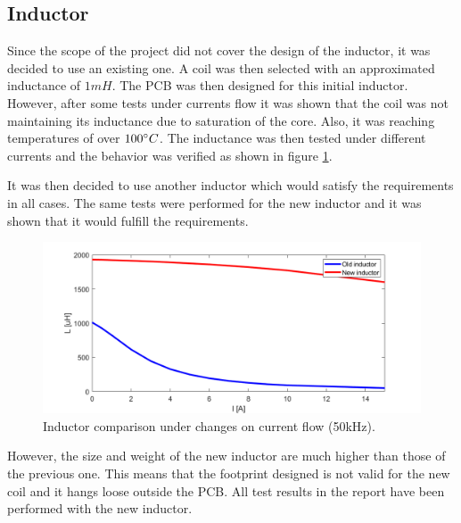 \subsection{Inductor}
\label{Coil problems}
Since the scope of the project did not cover the design of the inductor, it was decided to use an existing one. A coil was then selected with an approximated inductance of $1mH$.
The PCB was then designed for this initial inductor. However, after some  tests under currents flow it was shown that the coil was not maintaining its inductance due to saturation of the core. Also, it was reaching temperatures of over $100\dec C$. The inductance was then tested under different currents and the behavior was verified as shown in figure \ref{Coil comparison}.

It was then decided to use another inductor which would satisfy the requirements in all cases. The same tests were performed for the new inductor and it was shown that it would fulfill the requirements. 

\begin{figure}[H]
	\begin{center}
		\includegraphics[width=1\textwidth]{docs/discussion/CoilTests/CoilComparison50kHzV2.png}
		\caption{Inductor comparison under changes on current flow (50kHz).}
		\label{Coil comparison}
	\end{center}	
\end{figure}

However, the size and weight of the new inductor are much higher than those of the previous one. This means that the footprint designed is not valid for the new coil and it hangs loose outside the PCB. All test results in the report have been performed with the new inductor.

